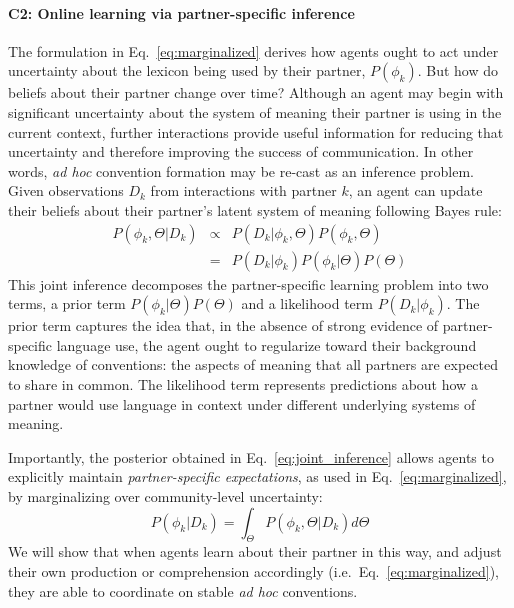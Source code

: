\paragraph{C2: Online learning via partner-specific inference}

The formulation in Eq.~\ref{eq:marginalized} derives how agents ought to act under uncertainty about the lexicon being used by their partner, $P(\phi_k)$.
But how do beliefs about their partner change over time?
Although an agent may begin with significant uncertainty about the system of meaning their partner is using in the current context, further interactions provide useful information for reducing that uncertainty and therefore improving the success of communication.
In other words, \emph{ad hoc} convention formation may be re-cast as an inference problem.
Given observations $D_k$ from interactions with partner $k$, an agent can update their beliefs about their partner's latent system of meaning following Bayes rule:
\begin{equation}
\begin{array}{rcl}
\label{eq:joint_inference}
P(\phi_k, \Theta | D_k)  & \propto &  P(D_k | \phi_k, \Theta) P(\phi_k, \Theta) \\
                           & =   & P(D_k | \phi_k) P(\phi_k | \Theta) P(\Theta)
\end{array}
\end{equation}
This joint inference decomposes the partner-specific learning problem into two terms, a prior term $P(\phi_k | \Theta)P(\Theta)$ and a likelihood term $P(D_k | \phi_k)$.
The prior term captures the idea that, in the absence of strong evidence of partner-specific language use, the agent ought to regularize toward their background knowledge of conventions: the aspects of meaning that all partners are expected to share in common.
The likelihood term represents predictions about how a partner would use language in context under different underlying systems of meaning.

Importantly, the posterior obtained in Eq.~\ref{eq:joint_inference} allows agents to explicitly maintain \emph{partner-specific expectations}, as used in Eq.~\ref{eq:marginalized}, by marginalizing over community-level uncertainty:
\begin{equation}
P(\phi_k | D_k) =  \int_{\Theta}P(\phi_k, \Theta | D_k)  d\Theta
\end{equation}
We will show that when agents learn about their partner in this way, and adjust their own production or comprehension accordingly (i.e.~Eq.~\ref{eq:marginalized}), they are able to coordinate on stable \emph{ad hoc} conventions.

